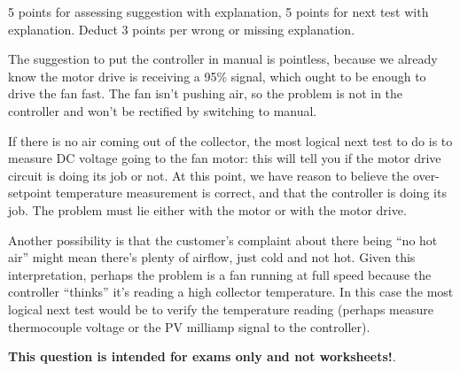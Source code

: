 





5 points for assessing suggestion with explanation, 5 points for next test with explanation.  Deduct 3 points per wrong or missing explanation.

\vskip 10pt

The suggestion to put the controller in manual is pointless, because we already know the motor drive is receiving a 95\% signal, which ought to be enough to drive the fan fast.  The fan isn't pushing air, so the problem is not in the controller and won't be rectified by switching to manual.

\vskip 10pt

If there is no air coming out of the collector, the most logical next test to do is to measure DC voltage going to the fan motor: this will tell you if the motor drive circuit is doing its job or not.  At this point, we have reason to believe the over-setpoint temperature measurement is correct, and that the controller is doing its job.  The problem must lie either with the motor or with the motor drive.

\vskip 10pt

Another possibility is that the customer's complaint about there being ``no hot air'' might mean there's plenty of airflow, just cold and not hot.  Given this interpretation, perhaps the problem is a fan running at full speed because the controller ``thinks'' it's reading a high collector temperature.  In this case the most logical next test would be to verify the temperature reading (perhaps measure thermocouple voltage or the PV milliamp signal to the controller).







{\bf This question is intended for exams only and not worksheets!}.



